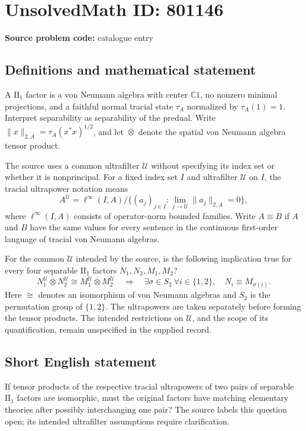\documentclass[11pt]{article}
\newcommand{\C}{\mathbb{C}}
\begin{document}
\section*{UnsolvedMath ID: 801146}
\textbf{Source problem code:} catalogue entry
\subsection{Definitions and mathematical statement}
A \(\mathrm{II}_1\) factor is a von Neumann algebra with center \(\C 1\), no nonzero minimal projections, and a faithful normal tracial state \(\tau_A\) normalized by \(\tau_A(1)=1\). Interpret separability as separability of the predual. Write \(\|x\|_{2,A}=\tau_A(x^*x)^{1/2}\), and let \(\overline{\otimes}\) denote the spatial von Neumann algebra tensor product.

The source uses a common ultrafilter \(\mathcal U\) without specifying its index set or whether it is nonprincipal. For a fixed index set \(I\) and ultrafilter \(\mathcal U\) on \(I\), the tracial ultrapower notation means
\[
A^{\mathcal U}=\ell^\infty(I,A)\big/\{(a_j)_{j\in I}:\lim_{j\to\mathcal U}\|a_j\|_{2,A}=0\},
\]
where \(\ell^\infty(I,A)\) consists of operator-norm bounded families. Write \(A\equiv B\) if \(A\) and \(B\) have the same values for every sentence in the continuous first-order language of tracial von Neumann algebras.

For the common \(\mathcal U\) intended by the source, is the following implication true for every four separable \(\mathrm{II}_1\) factors \(N_1,N_2,M_1,M_2\)?
\[
N_1^{\mathcal U}\overline{\otimes}N_2^{\mathcal U}
\cong
M_1^{\mathcal U}\overline{\otimes}M_2^{\mathcal U}
\quad\Longrightarrow\quad
\exists\sigma\in S_2\ \forall i\in\{1,2\},\quad N_i\equiv M_{\sigma(i)}.
\]
Here \(\cong\) denotes an isomorphism of von Neumann algebras and \(S_2\) is the permutation group of \(\{1,2\}\). The ultrapowers are taken separately before forming the tensor products. The intended restrictions on \(\mathcal U\), and the scope of its quantification, remain unspecified in the supplied record.
\subsection{Short English statement}
If tensor products of the respective tracial ultrapowers of two pairs of separable \(\mathrm{II}_1\) factors are isomorphic, must the original factors have matching elementary theories after possibly interchanging one pair? The source labels this question open; its intended ultrafilter assumptions require clarification.
\end{document}
